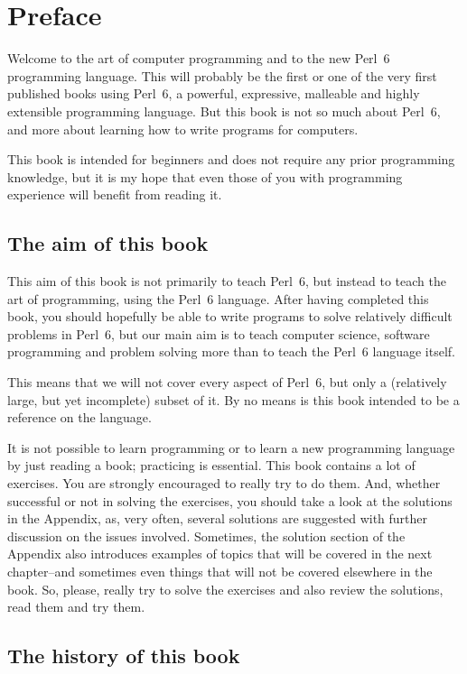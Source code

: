 
\chapter{Preface}

Welcome to the art of computer programming and to the 
new Perl~6 programming language. This will probably be 
the first or one of the very first published books using Perl~6, 
a powerful, expressive, malleable and highly extensible 
programming language. But this book is not so much 
about Perl~6, and more about learning 
how to write programs for computers. 

This book is intended for beginners and does not require 
any prior programming knowledge, but it is my hope 
that even those of you with programming experience will 
benefit from reading it.

\section*{The aim of this book}

This aim of this book is not primarily to teach Perl~6, 
but instead to teach the art 
of programming, using the Perl~6 language. After having 
completed this book, you should hopefully be able 
to write programs to solve relatively difficult problems in 
Perl~6, but our main aim is to teach computer science, software 
programming and problem solving more than to teach the Perl~6 
language itself. 

This means that we will not cover every aspect of Perl~6, but 
only a (relatively large, but yet incomplete) subset of it. 
By no means is this book intended to be a reference on the 
language.

It is not possible to learn programming or to learn a new 
programming language by just reading a book; practicing 
is essential. This book contains a lot of exercises. You 
are strongly encouraged to really try to do them. And, 
whether successful or not in solving the exercises, you 
should take a look at the solutions in the Appendix, 
as, very often, several solutions are suggested with further 
discussion on the issues involved. Sometimes, the solution 
section of the Appendix also introduces examples of topics 
that will be covered in the next chapter--and sometimes even 
things that will not be covered elsewhere in the book. So, 
please, really try to solve the exercises and also review 
the solutions, read them and try them.


\section*{The history of this book}

